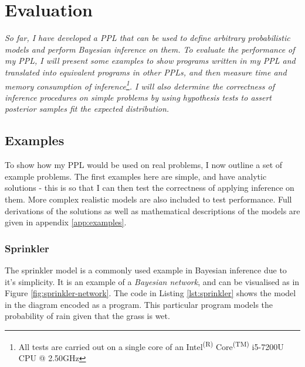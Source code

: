 



\chapter{Evaluation}

\textit{So far, I have developed a PPL that can be used to define arbitrary probabilistic models and perform Bayesian inference on them. To evaluate the performance of my PPL, I will present some examples to show programs written in my PPL and translated into equivalent programs in other PPLs, and then measure time and memory consumption of inference\footnote{All tests are carried out on a single core of an Intel\textsuperscript{(R)} Core\textsuperscript{(TM)} i5-7200U CPU @ 2.50GHz}. I will also determine the correctness of inference procedures on simple problems by using hypothesis tests to assert posterior samples fit the expected distribution.}

\section{Examples}
To show how my PPL would be used on real problems, I now outline a set of example problems. The first examples here are simple, and have analytic solutions - this is so that I can then test the correctness of applying inference on them. More complex realistic models are also included to test performance. Full derivations of the solutions as well as mathematical descriptions of the models are given in appendix \ref{app:examples}.

\subsection{Sprinkler}
The sprinkler model is a commonly used example in Bayesian inference due to it's simplicity. It is an example of a \textit{Bayesian network}, and can be visualised as in Figure \ref{fig:sprinkler-network}. The code in Listing \ref{lst:sprinkler} shows the model in the diagram encoded as a program. This particular program models the probability of rain given that the grass is wet.

